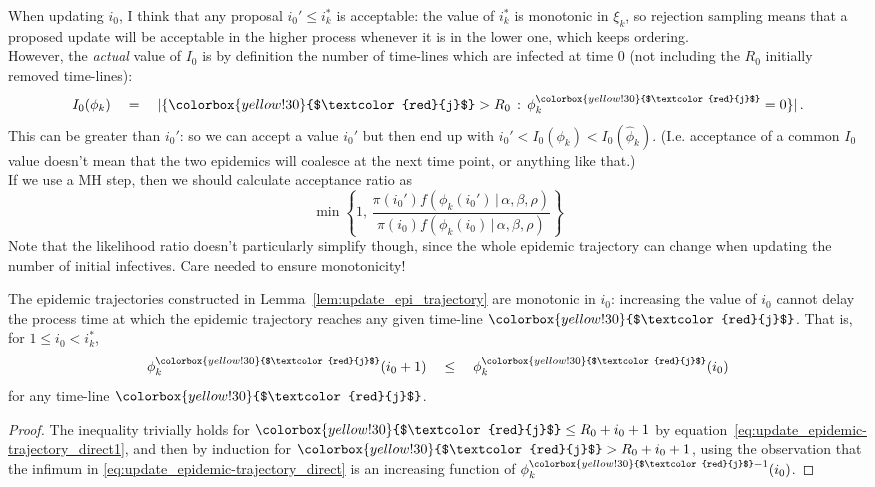 \documentclass[]{article}
\newcommand{\faster}[1]{\hat{#1}}
\newcommand{\slower}[1]{#1}
\newcommand{\infectee}{{\colorbox{yellow!30}{$\textcolor{red}{j}$}}}
\begin{document}
\begin{NoteThis2}
When updating \(i_0\), I think that any proposal \(i_0'\le i_k^*\) is acceptable: the value of \(i_k^*\) is monotonic in \(\xi_k\), so rejection sampling means that a proposed update will be acceptable in the higher process whenever it is in the lower one, which keeps ordering. \\
However, the \emph{actual} value of \(I_0\) is by definition the number of time-lines which are infected at time 0 (not including the \(R_0\) initially removed time-lines):
\[
I_0(\phi_k) \quad=\quad |\{\infectee>R_0\,:\, \phi_k^\infectee = 0\}|  \,.
\]
This can be greater than \(i_0'\): so we can accept a value \(i_0'\) but then end up with \(i_0' < I_0(\slower{\phi}_k) < I_0(\faster{\phi}_k)\). (I.e. acceptance of a common \(I_0\) value doesn't mean that the two epidemics will coalesce at the next time point, or anything like that.)\\
If we use a MH step, then we should calculate acceptance ratio as 
\[
\min\left\{1,\, \frac{\pi(i_0')f(\phi_k(i_0')\,|\, \alpha, \beta, \rho)}%
{\pi(i_0)f(\phi_k(i_0)\,|\, \alpha, \beta, \rho)} \right\}
\]
Note that the likelihood ratio doesn't particularly simplify though, since the whole epidemic trajectory can change when updating the number of initial infectives. Care needed to ensure monotonicity!
\end{NoteThis2}


\begin{cor}\label{cor:epi_trajectory_monotonic}
	The epidemic trajectories constructed in Lemma~\ref{lem:update_epi_trajectory} are monotonic in \(i_0\): increasing the value of \(i_0\) cannot delay the process time at which the epidemic trajectory reaches any given time-line \(\infectee\). That is, for \(1\le i_0<i_k^*\),
	\[
	 \phi_k^{\infectee}(i_0+1) \quad \le \quad 	\phi_k^{\infectee}(i_0) 
	\]
	for any time-line \(\infectee\).
\end{cor}

\begin{proof}
	The inequality trivially holds for \(\infectee\le R_0+i_0+1\) by equation~\eqref{eq:update_epidemic-trajectory_direct1}, and then by induction for \(\infectee > R_0+i_0+1\), using the observation that the infimum in \eqref{eq:update_epidemic-trajectory_direct} is an increasing function of \(\phi_k^{\infectee-1}(i_0)\).
\end{proof}
\end{document}
